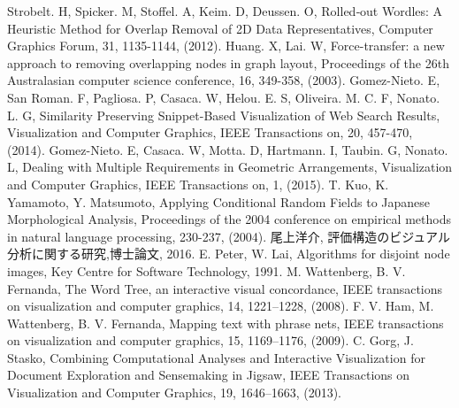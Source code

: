 \documentclass[syuuron]{kuee}
\begin{document}
\begin{thebibliography}{数字}
	 Strobelt. H, Spicker. M, Stoffel. A, Keim. D, Deussen. O, Rolled‐out Wordles: A Heuristic Method for Overlap Removal of 2D Data Representatives, Computer Graphics Forum, 31, 1135-1144, (2012).
	 Huang. X, Lai. W, Force-transfer: a new approach to removing overlapping nodes in graph layout, Proceedings of the 26th Australasian computer science conference, 16, 349-358, (2003).
	 Gomez-Nieto. E, San Roman. F, Pagliosa. P, Casaca. W, Helou. E. S, Oliveira. M. C. F, Nonato. L. G, Similarity Preserving Snippet-Based Visualization of Web Search Results, Visualization and Computer Graphics, IEEE Transactions on, 20, 457-470, (2014).
	 Gomez-Nieto. E, Casaca. W, Motta. D, Hartmann. I, Taubin. G, Nonato. L, Dealing with Multiple Requirements in Geometric Arrangements, Visualization and Computer Graphics, IEEE Transactions on, 1, (2015).
	 T. Kuo, K. Yamamoto, Y. Matsumoto, Applying Conditional Random Fields to Japanese Morphological Analysis, Proceedings of the 2004 conference on empirical methods in natural language processing, 230-237, (2004).
	 尾上洋介, 評価構造のビジュアル分析に関する研究,博士論文, 2016.
	 E. Peter, W. Lai, Algorithms for disjoint node images, Key Centre for Software Technology, 1991.
	 M. Wattenberg, B. V. Fernanda, The Word Tree, an interactive visual concordance, IEEE transactions on visualization and computer graphics, 14, 1221–1228, (2008).
	 F. V. Ham, M. Wattenberg, B. V. Fernanda, Mapping text with phrase nets, IEEE transactions on visualization and computer graphics, 15, 1169–1176, (2009).
	 C. Gorg, J. Stasko, Combining Computational Analyses and Interactive Visualization for Document Exploration and Sensemaking in Jigsaw, IEEE Transactions on Visualization and Computer Graphics, 19, 1646–1663, (2013).
\end{thebibliography}

\appendix
\end{document}
